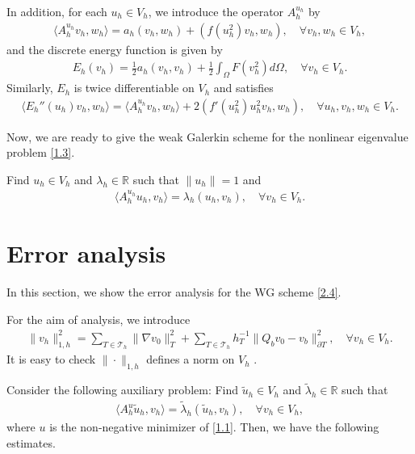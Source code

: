 \documentclass[10pt,a4paper]{amsart}
\numberwithin{equation}{section}
\newcommand{\sumT}{\sum_{T\in\mathcal{T}_h}}     %
\newcommand{\Real}{\mathbb{R}}
\newcommand{\la}{\langle}
\newcommand{\ran}{\rangle}
\begin{document}
	In addition, for each $u_h\in V_h$, we introduce the operator $A_h^{u_h}$ by
	\begin{eqnarray}\label{2.3}
		\la A_h^{u_h}v_h, w_h\ran=a_h( v_h, w_h)+(f(u_h^2)v_h,w_h), \quad\forall v_h,w_h\in V_h,
	\end{eqnarray}
	and the discrete energy function is given by
	\begin{eqnarray}\label{Eh}
		E_h(v_h)=\frac12 a_h(v_h,v_h)+\frac12\displaystyle\int_\Omega F(v_h^2)d\Omega, \quad\forall v_h\in V_h.
	\end{eqnarray}
	Similarly, $E_h$ is twice differentiable on $V_h$ and satisfies
	\begin{eqnarray}\label{E''h}
		\la E_h''(u_h)v_h,w_h\ran=\la A_h^{u_h}v_h,w_h\ran+2(f'(u_h^2)u_h^2v_h,w_h),\quad\forall u_h, v_h,w_h\in V_h.
	\end{eqnarray}
	
	Now, we are ready to give the weak Galerkin scheme for the nonlinear eigenvalue problem \eqref{1.3}.
	\begin{algorithm}[ht!]
		\caption{The weak Galerkin scheme for \eqref{1.3}.}
		Find $ u_h\in V_h$ and $\lambda_h\in\Real$ such that $\| u_h\|=1$ and
		\begin{eqnarray}\label{2.4}
			\la A_h^{u_h} u_h, v_h\ran=\lambda_h(u_h,v_h),\quad\forall  v_h\in V_h.
		\end{eqnarray}
	\end{algorithm}

\section{Error analysis}In this section, we show the error analysis for the WG scheme \eqref{2.4}.

For the aim of analysis, we introduce
\begin{eqnarray*}
	\|v_h\|_{1,h}^2=\sumT\|\nabla v_0\|_T^2+\sumT h_T^{-1}\|  Q_bv_0- v_b\|_{\partial T}^2,\quad\forall v_h\in V_h.
\end{eqnarray*}
It is easy to check $\|\cdot\|_{1,h}$ defines a norm on $V_h$ \cite{Zhai2019c,Wang2017b}.

Consider the following auxiliary problem: Find $\widetilde{u}_h\in V_h$ and $\widetilde{\lambda}_h\in\Real$ such that
\begin{eqnarray}\label{3.3}
	\la A_h^{u} \widetilde{u}_h, v_h\ran=\widetilde{\lambda}_h(\widetilde{u}_h,v_h),\quad\forall  v_h\in V_h,
\end{eqnarray}
where $u$ is the non-negative minimizer of \eqref{1.1}. Then, we have the following estimates.
\end{document}
